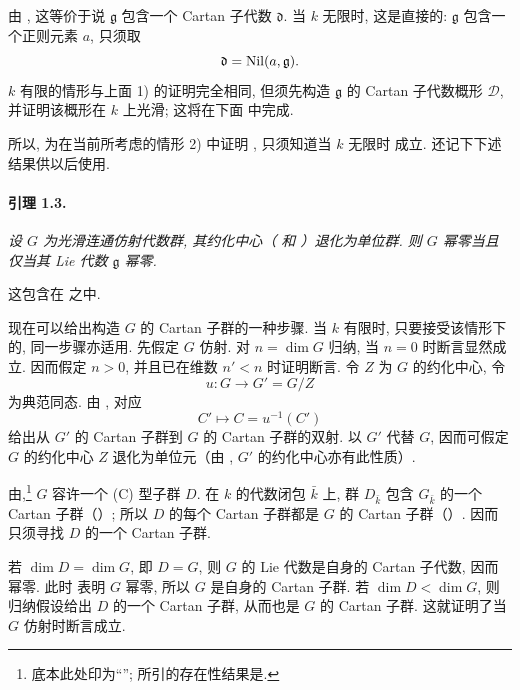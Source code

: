 由 , 这等价于说 \(\mathfrak g\) 包含一个 Cartan 子代数 \(\mathfrak d\). 当 \(k\) 无限时, 这是直接的: \(\mathfrak g\) 包含一个正则元素 \(a\), 只须取
\[
  \mathfrak d=\operatorname{Nil}(a,\mathfrak g).
\]
\(k\) 有限的情形与上面 \textup{1\textdegree)} 的证明完全相同, 但须先构造 \(\mathfrak g\) 的 Cartan 子代数概形 \(\mathcal D\), 并证明该概形在 \(k\) 上光滑; 这将在下面  中完成.

所以, 为在当前所考虑的情形 \textup{2\textdegree)} 中证明 , 只须知道当 \(k\) 无限时  成立. 还记下下述结果供以后使用.

\paragraph{\textbf{引理 1.3.}}
\emph{设 \(G\) 为光滑连通仿射代数群, 其约化中心\textup{（ 和 ）}退化为单位群. 则 \(G\) 幂零当且仅当其 Lie 代数 \(\mathfrak g\) 幂零.}

这包含在  之中.

现在可以给出构造 \(G\) 的 Cartan 子群的一种步骤. 当 \(k\) 有限时, 只要接受该情形下的, 同一步骤亦适用. 先假定 \(G\) 仿射. 对 \(n=\dim G\) 归纳, 当 \(n=0\) 时断言显然成立. 因而假定 \(n>0\), 并且已在维数 \(n'<n\) 时证明断言. 令 \(Z\) 为 \(G\) 的约化中心, 令
\[
  u\colon G\longrightarrow G'=G/Z
\]
为典范同态. 由 , 对应
\[
  C'\longmapsto C=u^{-1}(C')
\]
给出从 \(G'\) 的 Cartan 子群到 \(G\) 的 Cartan 子群的双射. 以 \(G'\) 代替 \(G\), 因而可假定 \(G\) 的约化中心 \(Z\) 退化为单位元\textup{（由 , \(G'\) 的约化中心亦有此性质）}.

由,\footnote{底本此处印为“”; 所引的存在性结果是.} \(G\) 容许一个 \textup{(C)} 型子群 \(D\). 在 \(k\) 的代数闭包 \(\bar k\) 上, 群 \(D_{\bar k}\) 包含 \(G_{\bar k}\) 的一个 Cartan 子群\textup{（）}; 所以 \(D\) 的每个 Cartan 子群都是 \(G\) 的 Cartan 子群\textup{（）}. 因而只须寻找 \(D\) 的一个 Cartan 子群.

若 \(\dim D=\dim G\), 即 \(D=G\), 则 \(G\) 的 Lie 代数是自身的 Cartan 子代数, 因而幂零. 此时 表明 \(G\) 幂零, 所以 \(G\) 是自身的 Cartan 子群. 若 \(\dim D<\dim G\), 则归纳假设给出 \(D\) 的一个 Cartan 子群, 从而也是 \(G\) 的 Cartan 子群. 这就证明了当 \(G\) 仿射时断言成立.

